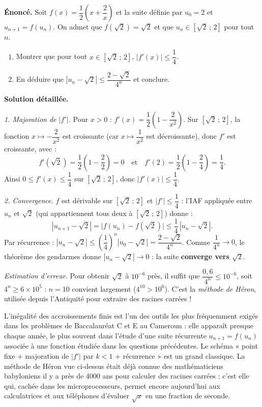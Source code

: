 \documentclass[11pt]{article}
\begin{document}
\begin{exoresolu}
\textbf{Énoncé.} Soit $f(x) = \dfrac{1}{2}\left(x + \dfrac{2}{x}\right)$ et la suite définie par $u_0 = 2$ et $u_{n+1} = f(u_n)$. On admet que $f(\sqrt{2}) = \sqrt{2}$ et que $u_n \in [\sqrt{2}\,;\,2]$ pour tout $n$.
\begin{enumerate}
\item Montrer que pour tout $x \in [\sqrt{2}\,;\,2]$, $|f'(x)| \leq \dfrac{1}{4}$.
\item En déduire que $|u_n - \sqrt{2}| \leq \dfrac{2 - \sqrt{2}}{4^n}$ et conclure.
\end{enumerate}
\tcblower
\textbf{Solution détaillée.}

\emph{1. Majoration de $|f'|$.} Pour $x > 0$ : $f'(x) = \dfrac{1}{2}\left(1 - \dfrac{2}{x^2}\right)$. Sur $[\sqrt{2}\,;\,2]$, la fonction $x \mapsto -\dfrac{2}{x^2}$ est croissante (car $x \mapsto \dfrac{1}{x^2}$ est décroissante), donc $f'$ est croissante, avec :
\[ f'(\sqrt{2}) = \frac{1}{2}\left(1 - \frac{2}{2}\right) = 0 \quad \text{et} \quad f'(2) = \frac{1}{2}\left(1 - \frac{2}{4}\right) = \frac{1}{4}. \]
Ainsi $0 \leq f'(x) \leq \dfrac{1}{4}$ sur $[\sqrt{2}\,;\,2]$, donc $|f'(x)| \leq \dfrac{1}{4}$.

\emph{2. Convergence.} $f$ est dérivable sur $[\sqrt{2}\,;\,2]$ et $|f'| \leq \dfrac14$ : l'IAF appliquée entre $u_n$ et $\sqrt{2}$ (qui appartiennent tous deux à $[\sqrt{2}\,;\,2]$) donne :
\[ |u_{n+1} - \sqrt{2}| = \bigl|f(u_n) - f(\sqrt{2})\bigr| \leq \frac{1}{4}\,|u_n - \sqrt{2}|. \]
Par récurrence : $|u_n - \sqrt{2}| \leq \left(\dfrac{1}{4}\right)^n |u_0 - \sqrt{2}| = \dfrac{2 - \sqrt{2}}{4^n}$. Comme $\dfrac{1}{4^n} \to 0$, le théorème des gendarmes donne $|u_n - \sqrt{2}| \to 0$ : la suite \textbf{converge vers $\sqrt{2}$}.

\emph{Estimation d'erreur.} Pour obtenir $\sqrt{2}$ à $10^{-6}$ près, il suffit que $\dfrac{0{,}6}{4^n} \leq 10^{-6}$, soit $4^n \geq 6 \times 10^{5}$ : $n = 10$ convient largement ($4^{10} > 10^{6}$). C'est la \emph{méthode de Héron}, utilisée depuis l'Antiquité pour extraire des racines carrées !
\end{exoresolu}

\begin{savaistu}
L'inégalité des accroissements finis est l'un des outils les plus fréquemment exigés dans les problèmes de Baccalauréat C et E au Cameroun : elle apparaît presque chaque année, le plus souvent dans l'étude d'une suite récurrente $u_{n+1} = f(u_n)$ associée à une fonction étudiée dans les questions précédentes. Le schéma « point fixe + majoration de $|f'|$ par $k < 1$ + récurrence » est un grand classique. La méthode de Héron vue ci-dessus était déjà connue des mathématiciens babyloniens il y a près de 4000 ans pour calculer des racines carrées : c'est elle qui, cachée dans les microprocesseurs, permet encore aujourd'hui aux calculatrices et aux téléphones d'évaluer $\sqrt{x}$ en une fraction de seconde.
\end{savaistu}
\end{document}
